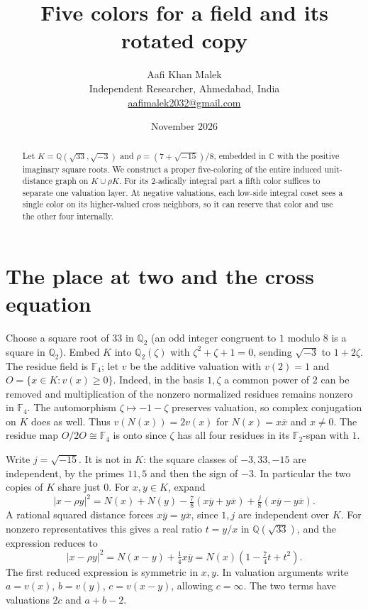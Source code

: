 \documentclass[10pt,letterpaper]{article}
\title{Five colors for a field and its rotated copy}
\author{Aafi Khan Malek\\\small Independent Researcher, Ahmedabad, India\\
\small \href{mailto:aafimalek2032@gmail.com}{aafimalek2032@gmail.com}}
\date{November 2026}
\begin{document}
\maketitle
\begin{abstract}
Let \(K=\mathbb Q(\sqrt{33},\sqrt{-3})\) and
\(\rho=(7+\sqrt{-15})/8\), embedded in \(\mathbb C\) with the
positive imaginary square roots. We construct a proper five-coloring
of the entire induced unit-distance graph on \(K\cup\rho K\).
For its \(2\)-adically integral part a fifth color suffices to separate
one valuation layer. At negative valuations, each low-side integral
coset sees a single color on its higher-valued cross neighbors,
so it can reserve that color and use the other four internally.
\end{abstract}

\section*{The place at two and the cross equation}
Choose a square root of \(33\) in \(\mathbb Q_2\) (an odd
integer congruent to \(1\) modulo \(8\) is a square in
\(\mathbb Q_2\)). Embed \(K\) into \(\mathbb Q_2(\zeta)\) with
\(\zeta^2+\zeta+1=0\), sending \(\sqrt{-3}\) to \(1+2\zeta\).
The residue field is \(\mathbb F_4\); let \(v\) be the additive
valuation with \(v(2)=1\) and \(O=\{x\in K:v(x)\geq0\}\).
Indeed, in the basis \(1,\zeta\) a common power of \(2\)
can be removed and multiplication of the nonzero normalized
residues remains nonzero in \(\mathbb F_4\).
The automorphism \(\zeta\mapsto-1-\zeta\) preserves valuation,
so complex conjugation on \(K\) does as well. Thus
\(v(N(x))=2v(x)\) for \(N(x)=x\overline x\) and \(x\ne0\).
The residue map \(O/2O\cong\mathbb F_4\) is onto since \(\zeta\)
has all four residues in its \(\mathbb F_2\)-span with \(1\).

Write \(j=\sqrt{-15}\). It is not in \(K\): the square classes
of \(-3,33,-15\) are independent, by the primes \(11,5\)
and then the sign of \(-3\). In particular the two copies of
\(K\) share just \(0\). For \(x,y\in K\), expand
\[
 |x-\rho y|^2=N(x)+N(y)
 -\tfrac78(x\overline y+y\overline x)
 +\tfrac j8(x\overline y-y\overline x).
\]
A rational squared distance forces \(x\overline y=y\overline x\),
since \(1,j\) are independent over \(K\). For nonzero
representatives this gives a real ratio \(t=y/x\) in
\(\mathbb Q(\sqrt{33})\), and the expression reduces to
\[
 |x-\rho y|^2=N(x-y)+\tfrac14 x\overline y
             =N(x)\left(1-\tfrac74t+t^2\right).
 \tag{1}
\]
The first reduced expression is symmetric in \(x,y\). In valuation
arguments write \(a=v(x)\), \(b=v(y)\), \(c=v(x-y)\), allowing \(c=\infty\).
The two terms have valuations \(2c\) and \(a+b-2\).
\end{document}
